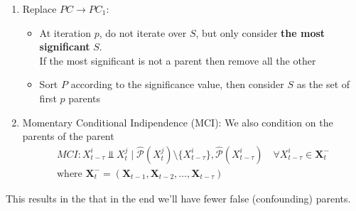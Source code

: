 \begin{enumerate}
    \item Replace $PC\rightarrow PC_1$:
    \begin{itemize}
        \item At iteration $p$, do not iterate over $S$, but only consider \textbf{the most significant} $S$.\\
        If the most significant is not a parent then remove all the other
        \item Sort $P$ according to the significance value, then consider $S$ as the set of first $p$ parents
    \end{itemize}
    \item Momentary Conditional Indipendence (MCI): We also condition on the parents of the parent
    \begin{eqnarray*}
        MCI: X^i_{t-\tau}\Perp X^j_{t}\;|\;\hat{\mathcal{P}}(X^j_t)\setminus\{X^i_{t-\tau}\}, \hat{\mathcal{P}}(X^i_{t-\tau})\quad \forall X^i_{t-\tau}\in \bm{X}^-_t\\
        \text{where } \bm{X}^-_t=(\bm{X}_{t-1}, \bm{X}_{t-2},\ldots,\bm{X}_{t-\tau})
    \end{eqnarray*}
\end{enumerate}
This results in the \advantage that in the end we'll have fewer false (confounding) parents.